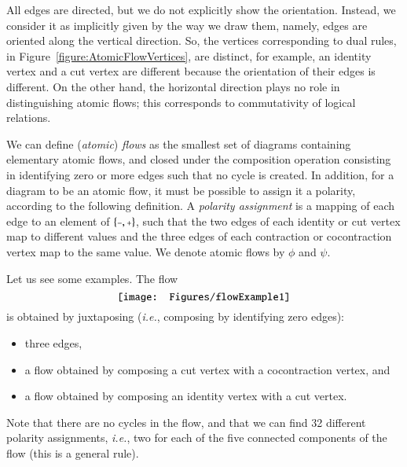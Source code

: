 All edges are directed, but we do not explicitly show the orientation. Instead, we consider it as implicitly given by the way we draw them, namely, edges are oriented along the vertical direction. So, the vertices corresponding to dual rules, in Figure~\ref{figure:AtomicFlowVertices}, are distinct, for example, an identity vertex and a cut vertex are different because the orientation of their edges is different. On the other hand, the horizontal direction plays no role in distinguishing atomic flows; this corresponds to commutativity of logical relations.

\newcommand{\ppl}{{\mathchoice{\scriptstyle+}
                              {\scriptstyle+}
                              {\scriptstyle+}
                              {\scriptscriptstyle+}}}
\newcommand{\pmi}{{\mathchoice{\scriptstyle-}
                              {\scriptstyle-}
                              {\scriptstyle-}
                              {\scriptscriptstyle-}}}
We can define (\emph{atomic}) \emph{flows} as the smallest set of diagrams containing elementary atomic flows, and closed under the composition operation consisting in identifying zero or more edges such that no cycle is created. In addition, for a diagram to be an atomic flow, it must be possible to assign it a polarity, according to the following definition. A \emph{polarity assignment} is a mapping of each edge to an element of $\{\pmi,\ppl\}$, such that the two edges of each identity or cut vertex map to different values and the three edges of each contraction or cocontraction vertex map to the same value. We denote atomic flows by $\phi$ and $\psi$.

Let us see some examples. The flow
\begin{equation}\label{ExFlow}
\vcenter{\hbox{\texttt{[image: Figures/flowExample1]}}}
\end{equation}
is obtained by juxtaposing (\emph{i.e.}, composing by identifying zero edges):
\begin{itemize}
\item three edges, 
\item a flow obtained by composing a cut vertex with a cocontraction vertex, and
\item a flow obtained by composing an identity vertex with a cut vertex.
\end{itemize}
Note that there are no cycles in the flow, and that we can find 32 different polarity assignments, \emph{i.e.}, two for each of the five connected components of the flow (this is a general rule).

